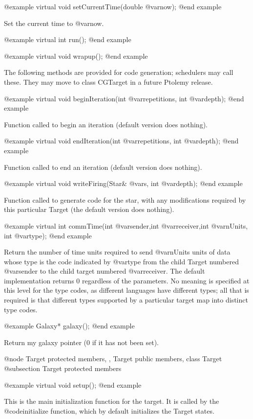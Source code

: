 @example
virtual void setCurrentTime(double @var{now});
@end example

Set the current time to @var{now}.

@example
virtual int run();
@end example

@example
virtual void wrapup();
@end example

The following methods are provided for code generation; schedulers may
call these.  They may move to class CGTarget in a future Ptolemy release.

@example
virtual void beginIteration(int @var{repetitions}, int @var{depth});
@end example

Function called to begin an iteration (default version
does nothing).

@example
virtual void endIteration(int @var{repetitions}, int @var{depth});
@end example

Function called to end an iteration (default version
does nothing).

@example
virtual void writeFiring(Star& @var{s}, int @var{depth});
@end example

Function called to generate code for the star, with any modifications
required by this particular Target (the default version does nothing).

@example
virtual int commTime(int @var{sender},int @var{receiver},int @var{nUnits}, int @var{type});
@end example

Return the number of time units required to send @var{nUnits} units of
data whose type is the code indicated by @var{type} from the child Target
numbered @var{sender} to the child target numbered @var{receiver}.
The default implementation returns 0 regardless of the parameters.
No meaning is specified at this level for the type codes, as different
languages have different types; all that is required is that different
types supported by a particular target map into distinct type codes.

@example
Galaxy* galaxy();
@end example

Return my galaxy pointer (0 if it has not been set).

@node Target protected members,  , Target public members, class Target
@subsection Target protected members

@example
virtual void setup();
@end example

This is the main initialization function for the target.  It is called
by the @code{initialize} function, which by default initializes the
Target states.

